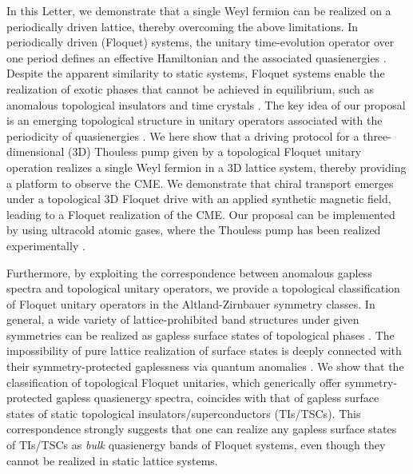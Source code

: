\documentclass[
floatfix,
pra,
twocolumn,
reprint,
amsmath,amssymb,
aps,
footnote,
]{revtex4}
\begin{document}
In this Letter, we demonstrate that a single Weyl fermion can be realized on a periodically driven lattice, thereby overcoming the above limitations.
In periodically driven (Floquet) systems, the unitary time-evolution operator over one period defines an effective Hamiltonian and the associated quasienergies \cite{Eckardt17}.
Despite the apparent similarity to static systems, Floquet systems enable the realization of exotic phases that cannot be achieved in equilibrium, such as anomalous  topological insulators \cite{Kitagawa10, Rudner13} and time crystals \cite{Else16, Yao17}.
The key idea of our proposal is an emerging topological structure in unitary operators associated with the periodicity of quasienergies \cite{Kitagawa10}.
We here show that a driving protocol for a three-dimensional (3D) Thouless pump \cite{Thouless83, Kitagawa10} given by a topological Floquet unitary operation realizes a single Weyl fermion in a 3D lattice system, thereby providing a platform to observe the CME.
We demonstrate that chiral transport emerges under a topological 3D Floquet drive with an applied synthetic magnetic field, leading to a Floquet realization of the CME.
Our proposal can be implemented by using ultracold atomic gases, where the Thouless pump has been realized experimentally \cite{Nakajima16, Lohse16}.

Furthermore, by exploiting the correspondence between anomalous gapless spectra and topological unitary operators, we provide a topological classification of Floquet unitary operators in the Altland-Zirnbauer symmetry classes.
In general, a wide variety of lattice-prohibited band structures under given symmetries can be realized as gapless surface states of topological phases \cite{QiZhang11}.
The impossibility of pure lattice realization of surface states is deeply connected with their symmetry-protected gaplessness via quantum anomalies \cite{RyuZhang12, Sule13, Hsieh16}.
We show that the classification of topological Floquet unitaries, which generically offer symmetry-protected gapless quasienergy spectra, coincides with that of gapless surface states of static topological insulators/superconductors (TIs/TSCs). This correspondence strongly suggests that one can realize any gapless surface states of TIs/TSCs as \textit{bulk} quasienergy bands of Floquet systems, even though they cannot be realized in static lattice systems.
\end{document}
